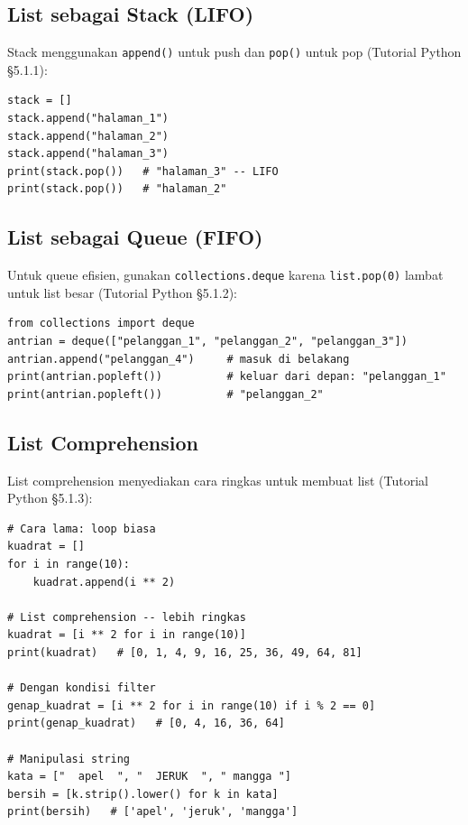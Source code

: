 \documentclass[../main.tex]{subfiles}
\begin{document}
\subsection{List sebagai Stack (LIFO)}

Stack menggunakan \texttt{append()} untuk push dan \texttt{pop()} untuk pop (Tutorial Python §5.1.1):

\begin{lstlisting}[caption=List sebagai stack]
stack = []
stack.append("halaman_1")
stack.append("halaman_2")
stack.append("halaman_3")
print(stack.pop())   # "halaman_3" -- LIFO
print(stack.pop())   # "halaman_2"
\end{lstlisting}

\subsection{List sebagai Queue (FIFO)}

Untuk queue efisien, gunakan \texttt{collections.deque} karena \texttt{list.pop(0)} lambat untuk list besar (Tutorial Python §5.1.2):

\begin{lstlisting}[caption=Queue dengan collections.deque]
from collections import deque
antrian = deque(["pelanggan_1", "pelanggan_2", "pelanggan_3"])
antrian.append("pelanggan_4")     # masuk di belakang
print(antrian.popleft())          # keluar dari depan: "pelanggan_1"
print(antrian.popleft())          # "pelanggan_2"
\end{lstlisting}

\subsection{List Comprehension}

List comprehension menyediakan cara ringkas untuk membuat list (Tutorial Python §5.1.3):

\begin{lstlisting}[caption=List comprehension]
# Cara lama: loop biasa
kuadrat = []
for i in range(10):
    kuadrat.append(i ** 2)

# List comprehension -- lebih ringkas
kuadrat = [i ** 2 for i in range(10)]
print(kuadrat)   # [0, 1, 4, 9, 16, 25, 36, 49, 64, 81]

# Dengan kondisi filter
genap_kuadrat = [i ** 2 for i in range(10) if i % 2 == 0]
print(genap_kuadrat)   # [0, 4, 16, 36, 64]

# Manipulasi string
kata = ["  apel  ", "  JERUK  ", " mangga "]
bersih = [k.strip().lower() for k in kata]
print(bersih)   # ['apel', 'jeruk', 'mangga']
\end{lstlisting}
\end{document}
